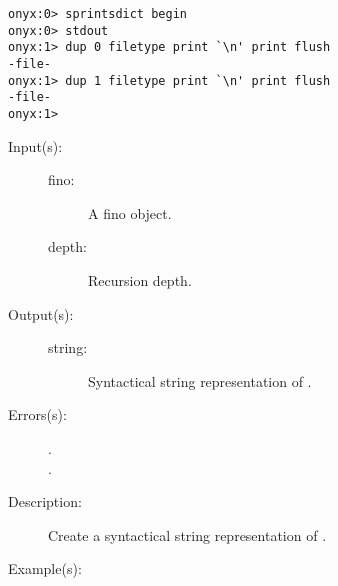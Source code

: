 \begin{description}
\begin{description}
\begin{verbatim}
onyx:0> sprintsdict begin
onyx:0> stdout
onyx:1> dup 0 filetype print `\n' print flush
-file-
onyx:1> dup 1 filetype print `\n' print flush
-file-
onyx:1>
		\end{verbatim}
	\end{description}
\label{sprintsdict:finotype}
\item[{\onyxop{fino depth}{finotype}{string}}: ]
	\begin{description}\item[]
	\item[Input(s): ]
		\begin{description}\item[]
		\item[fino: ]
			A fino object.
		\item[depth: ]
			Recursion depth.
		\end{description}
	\item[Output(s): ]
		\begin{description}\item[]
		\item[string: ]
			Syntactical string representation of .
		\end{description}
	\item[Errors(s): ]
		\begin{description}\item[]
		\item[.]
		\item[.]
		\end{description}
	\item[Description: ]
		Create a syntactical string representation of .
	\item[Example(s): ]\begin{verbatim}


\end{verbatim}
\end{description}
\end{description}
